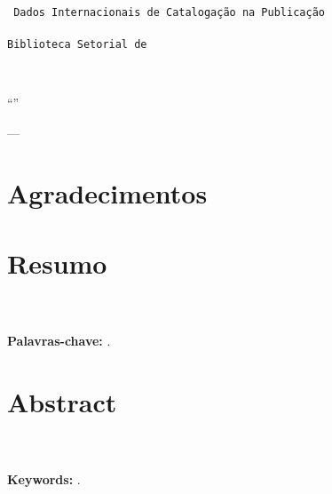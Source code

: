 \noindent 
\vspace{180mm}
\\
\texttt{
	Dados Internacionais de Catalogação na Publicação \\
	\universidade \\
	Biblioteca Setorial de \curso
}

\newpage

\noindent \\
\vspace{120mm}
\begin{flushright}
	\begin{minipage}{70mm}
		``\emph{\citacao}''
		\begin{flushright}
			--- \autorcitacao
		\end{flushright}
	\end{minipage}
\end{flushright}

\chapter{Agradecimentos}
	
	\agradecimentos

\chapter{Resumo}
	\resumo \\
	\\
	\noindent \textbf{Palavras-chave:} \palavraschave.
%

\newpage

\chapter{Abstract}

	\abstract \\
	\\
	\noindent \textbf{Keywords:} \keywords.
%